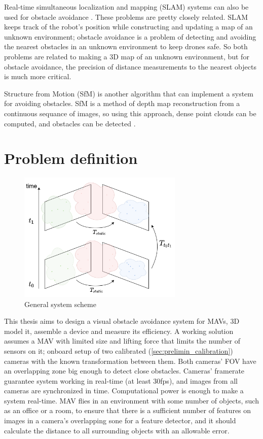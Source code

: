 Real-time simultaneous localization and mapping (SLAM) systems can also be used for obstacle avoidance \cite{Moreno2014}. 
These problems are pretty closely related. 
SLAM keeps track of the robot's position while constructing and updating a map of an unknown environment; obstacle avoidance is a problem of detecting and avoiding the nearest obstacles in an unknown environment to keep drones safe.
So both problems are related to making a 3D map of an unknown environment, but for obstacle avoidance, the precision of distance measurements to the nearest objects is much more critical.

Structure from Motion (SfM) is another algorithm that can implement a system for avoiding obstacles. 
SfM is a method of depth map reconstruction from a continuous sequance of images, so using this approach, dense point clouds can be computed, and obstacles can be detected \cite{Lee2008}. 

\section{Problem definition}
\begin{figure}[t]
    \centering
    \includegraphics[width=0.7\textwidth]{graphics/general_scheme.png}
    \caption{General system scheme}
    \label{fig:intro_general}
\end{figure}

This thesis aims to design a visual obstacle avoidance system for MAVs, 3D model it, assemble a device and measure its efficiency. 
A working solution assumes a MAV with limited size and lifting force that limits the number of sensors on it; onboard setup of two calibrated (\autoref{sec:prelimin_calibration}) cameras with the known transformation between them.
Both cameras' FOV have an overlapping zone big enough to detect close obstacles.
Cameras' framerate guarantee system working in real-time (at least 30fps), and images from all cameras are synchronized in time.
Computational power is enough to make a system real-time.
MAV flies in an environment with some number of objects, such as an office or a room, to ensure that there is a sufficient number of features on images in a camera's overlapping sone for a feature detector, and it should calculate the distance to all surrounding objects with an allowable error.

